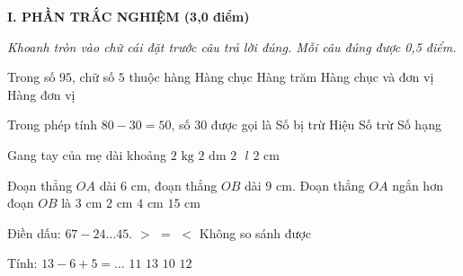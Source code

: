 
\setcounter{ex}{0}
\setcounter{bt}{0}

\textbf{\large I. PHẦN TRẮC NGHIỆM (3,0 điểm)}

{\itshape Khoanh tròn vào chữ cái đặt trước câu trả lời đúng. Mỗi câu đúng được 0,5 điểm.}

\begin{ex} %
Trong số $95$, chữ số $5$ thuộc hàng
\choice
{Hàng chục}
{Hàng trăm}
{Hàng chục và đơn vị}
{\True Hàng đơn vị}
\end{ex}

\begin{ex} %
Trong phép tính $80 - 30 = 50$, số $30$ được gọi là
\choice
{Số bị trừ}
{Hiệu}
{\True Số trừ}
{Số hạng}
\end{ex}

\begin{ex} %
Gang tay của mẹ dài khoảng
\choice
{$2\text{ kg}$}
{\True $2\text{ dm}$}
{$2\text{ }l$}
{$2\text{ cm}$}
\end{ex}

\begin{ex} %
Đoạn thẳng $OA$ dài $6\text{ cm}$, đoạn thẳng $OB$ dài $9\text{ cm}$. Đoạn thẳng $OA$ ngắn hơn đoạn $OB$ là
\choice
{\True $3\text{ cm}$}
{$2\text{ cm}$}
{$4\text{ cm}$}
{$15\text{ cm}$}
\end{ex}

\begin{ex} %
Điền dấu: $67 - 24 \dots 45$.
\choice
{$>$}
{$=$}
{\True $<$}
{Không so sánh được}
\end{ex}

\begin{ex} %
Tính: $13 - 6 + 5 = \dots$
\choice
{$11$}
{$13$}
{$10$}
{\True $12$}
\end{ex}

